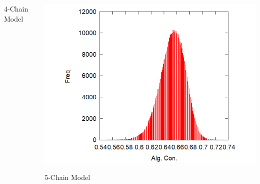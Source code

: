 \documentclass[12pt, dvipdfmx]{beamer}
\begin{document}
\begin{frame}
\begin{columns}[totalwidth=1\textwidth]
\begin{center}
					4-Chain Model
				\end{center}
				\begin{center}
					\includegraphics[width=1.2\columnwidth]{5.png}

					5-Chain Model
				\end{center}
		\end{columns}
\end{frame}


\end{document}
